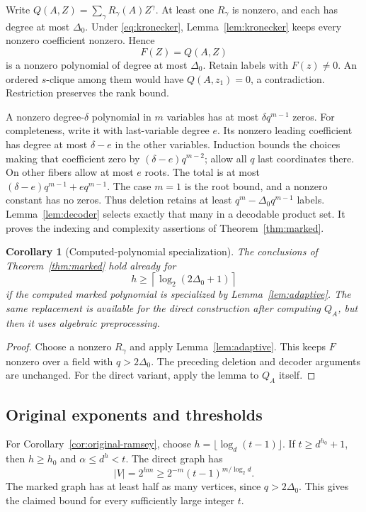 \documentclass[11pt,a4paper]{article}
\newtheorem{corollary}[theorem]{Corollary}
\theoremstyle{definition}
\theoremstyle{remark}
\numberwithin{equation}{section}
\begin{document}
Write $Q(A,Z)=\sum_\gamma R_\gamma(A)Z^\gamma$. At least one $R_\gamma$ is nonzero, and each has degree at most $\Delta_0$. Under \eqref{eq:kronecker}, Lemma~\ref{lem:kronecker} keeps every nonzero coefficient nonzero. Hence
\[
F(Z)=Q(A,Z)
\]
is a nonzero polynomial of degree at most $\Delta_0$. Retain labels with $F(z)\ne0$. An ordered $s$-clique among them would have $Q(A,z_1)=0$, a contradiction. Restriction preserves the rank bound.

A nonzero degree-$\delta$ polynomial in $m$ variables has at most $\delta q^{m-1}$ zeros. For completeness, write it with last-variable degree $e$. Its nonzero leading coefficient has degree at most $\delta-e$ in the other variables. Induction bounds the choices making that coefficient zero by $(\delta-e)q^{m-2}$; allow all $q$ last coordinates there. On other fibers allow at most $e$ roots. The total is at most $(\delta-e)q^{m-1}+eq^{m-1}$. The case $m=1$ is the root bound, and a nonzero constant has no zeros. Thus deletion retains at least $q^m-\Delta_0q^{m-1}$ labels. Lemma~\ref{lem:decoder} selects exactly that many in a decodable product set. It proves the indexing and complexity assertions of Theorem~\ref{thm:marked}.

\begin{corollary}[Computed-polynomial specialization]\label{cor:adaptive-marked}
The conclusions of Theorem~\ref{thm:marked} hold already for
\[
h\ge\left\lceil\log_2(2\Delta_0+1)\right\rceil
\]
if the computed marked polynomial is specialized by Lemma~\ref{lem:adaptive}. The same replacement is available for the direct construction after computing $Q_A$, but then it uses algebraic preprocessing.
\end{corollary}

\begin{proof}
Choose a nonzero $R_\gamma$ and apply Lemma~\ref{lem:adaptive}. This keeps $F$ nonzero over a field with $q>2\Delta_0$. The preceding deletion and decoder arguments are unchanged. For the direct variant, apply the lemma to $Q_A$ itself.
\end{proof}

\subsection{Original exponents and thresholds}\label{sec:original-exponents}
For Corollary~\ref{cor:original-ramsey}, choose $h=\lfloor\log_d(t-1)\rfloor$. If $t\ge d^{h_0}+1$, then $h\ge h_0$ and $\alpha\le d^h<t$. The direct graph has
\[
|V|=2^{hm}\ge2^{-m}(t-1)^{m/\log_2d}.
\]
The marked graph has at least half as many vertices, since $q>2\Delta_0$. This gives the claimed bound for every sufficiently large integer $t$.
\end{document}
